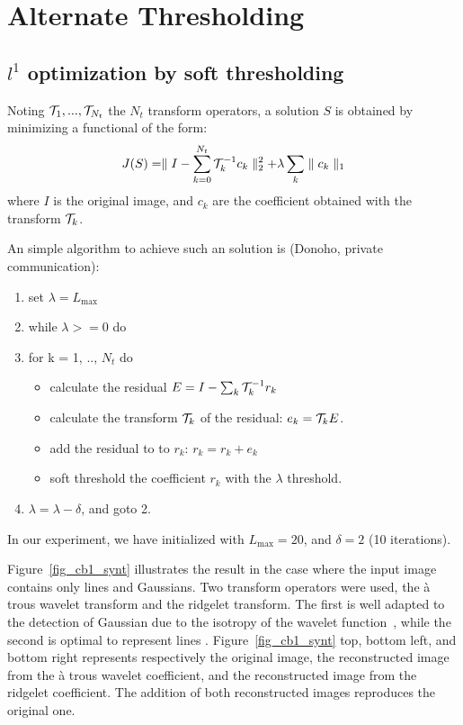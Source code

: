 \documentclass[11pt,draft]{IEEEtran} %
\begin{document}
\section{Alternate Thresholding}

\subsection{$l^1$ optimization by soft thresholding}
\label{sect_l1}

Noting ${\cal T}_1, ..., {\cal T}_{N_t}$ the $N_t$ transform operators, 
a solution $S$  is obtained by minimizing a functional of the form:
\begin{eqnarray}
J(S) = \parallel I - \sum_{k=0}^{N_t} {\cal T}_k^{-1} c_k  \parallel_2^2 + \lambda \sum_k \parallel c_k \parallel_1
\label{eqn_min_l1}
\end{eqnarray}
where $I$ is the original image, and $c_k$ are the coefficient 
obtained with the transform ${\cal T}_k$.

An simple algorithm to achieve such an solution 
is (Donoho, private communication):
\begin{enumerate}
\item set $\lambda = L_{\max}$
\item while $\lambda >= 0$ do
\item for k = 1, .., $N_{t}$ do
\begin{itemize}
\item calculate the residual $E = I - \sum_k {\cal T}_k^{-1} r_k$
\item calculate the  transform ${\cal T}_k$ of the residual:
$e_k = {\cal T}_k E$.
\item add the residual to to $r_k$:  $r_k = r_k + e_k$
\item soft threshold the coefficient $r_k$ with the $\lambda$ threshold.
\end{itemize}
\item $\lambda = \lambda - \delta$, and goto 2.
\end{enumerate}
In our experiment, we have initialized with $L_{\max} = 20$, and 
$\delta = 2$ (10 iterations).

Figure~\ref{fig_cb1_synt} illustrates the result in the case where the
input image contains only lines and Gaussians. Two transform operators
were used, the \`a trous wavelet transform and the ridgelet transform. The 
first is well adapted to the detection of Gaussian due to the isotropy of
the wavelet function~\cite{starckbook98}, while the second is optimal
to represent lines \cite{cur_candes99_1}. Figure~\ref{fig_cb1_synt} top,
bottom left, and bottom right represents respectively the 
original image, the reconstructed image from the \`a trous wavelet coefficient, 
and the reconstructed image from the ridgelet coefficient. The addition 
of both reconstructed images reproduces the original one.
\end{document}
